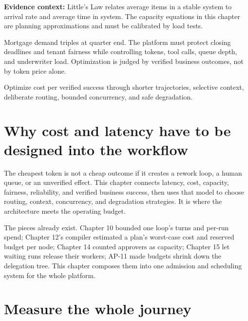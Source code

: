 
\begin{bookquote}

\textbf{Evidence context:} Little’s Law relates average items in a stable system to arrival rate and average time in system. The capacity equations in this chapter are planning approximations and must be calibrated by load tests. \textbf{}

\end{bookquote}

\begin{bookcallout}
Mortgage demand triples at quarter end. The platform must protect closing deadlines and tenant fairness while controlling tokens, tool calls, queue depth, and underwriter load. Optimization is judged by verified business outcomes, not by token price alone.
\end{bookcallout}

\begin{bookcallout}
Optimize cost per verified success through shorter trajectories, selective context, deliberate routing, bounded concurrency, and safe degradation.
\end{bookcallout}

\section{Why cost and latency have to be designed into the workflow}

The cheapest token is not a cheap outcome if it creates a rework loop, a human queue, or an unverified effect. This chapter connects latency, cost, capacity, fairness, reliability, and verified business success, then uses that model to choose routing, context, concurrency, and degradation strategies. It is where the architecture meets the operating budget.\par

The pieces already exist. Chapter 10 bounded one loop's turns and per-run spend; Chapter 12's compiler estimated a plan's worst-case cost and reserved budget per node; Chapter 14 counted approvers as capacity; Chapter 15 let waiting runs release their workers; AP-11 made budgets shrink down the delegation tree. This chapter composes them into one admission and scheduling system for the whole platform.\par

\section{Measure the whole journey}

